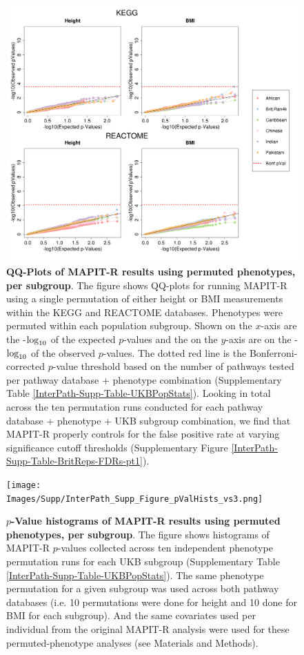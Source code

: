 \documentclass[12pt,a4paper]{article}
\def\log{{\rm log}}
\begin{document}
\begin{figure}[htbp]
\centering
\includegraphics[scale=.35]{Images/Supp/InterPath_Supp_Figure_perm1_QQPlots_AllPaths_vs2.png}
\caption[TBD]{\textbf{QQ-Plots of MAPIT-R results using permuted phenotypes, per subgroup}. The figure shows QQ-plots for running MAPIT-R using a single permutation of either height or BMI measurements within the KEGG and REACTOME databases. Phenotypes were permuted within each population subgroup. Shown on the $x$-axis are the -$\log_{10}$ of the expected $p$-values and the on the $y$-axis are on the -$\log_{10}$ of the observed $p$-values. The dotted red line is the Bonferroni-corrected $p$-value threshold based on the number of pathways tested per pathway database + phenotype combination (Supplementary Table \ref{InterPath-Supp-Table-UKBPopStats}). Looking in total across the ten permutation runs conducted for each pathway database + phenotype + UKB subgroup combination, we find that MAPIT-R properly controls for the false positive rate at varying significance cutoff thresholds (Supplementary Figure \ref{InterPath-Supp-Table-BritReps-FDRs-pt1}).}
\label{InterPath-Supp-Figure-perm1-QQPlots-AllPaths}
\end{figure}
\clearpage

\setlength{\footskip}{3cm}
\begin{figure}[htbp]
\centering
\vspace*{-2cm}
\texttt{[image: Images/Supp/InterPath\_Supp\_Figure\_pValHists\_vs3.png]}
\caption[TBD]{\textbf{$p$-Value histograms of MAPIT-R results using permuted phenotypes, per subgroup}. The figure shows histograms of MAPIT-R $p$-values collected across ten independent phenotype permutation runs for each UKB subgroup (Supplementary Table \ref{InterPath-Supp-Table-UKBPopStats}). The same phenotype permutation for a given subgroup was used across both pathway databases (i.e. 10 permutations were done for height and 10 done for BMI for each subgroup). And the same covariates used per individual from the original MAPIT-R analysis were used for these permuted-phenotype analyses (see Materials and Methods).}
\label{InterPath-Supp-Figure-10perms-pValHists}
\end{figure}
\clearpage
\setlength{\footskip}{1cm}
\end{document}
